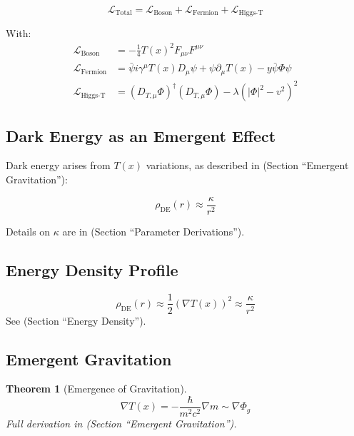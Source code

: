 \documentclass[a4paper,12pt]{article}
\newtheorem{theorem}{Theorem}[section]
\theoremstyle{definition}
\theoremstyle{remark}
\newcommand{\Tfield}{T(x)}
\newcommand{\DcovT}[1]{\Tfield D_\mu #1 + #1 \partial_\mu \Tfield}
\begin{document}
	\begin{equation}
		\mathcal{L}_{\text{Total}} = \mathcal{L}_{\text{Boson}} + \mathcal{L}_{\text{Fermion}} + \mathcal{L}_{\text{Higgs-T}}
	\end{equation}
	
	With:
	\begin{align}
		\mathcal{L}_{\text{Boson}} &= -\frac{1}{4} \Tfield^2 F_{\mu\nu} F^{\mu\nu} \\
		\mathcal{L}_{\text{Fermion}} &= \bar{\psi} i \gamma^\mu \DcovT{\psi} - y \bar{\psi} \Phi \psi \\
		\mathcal{L}_{\text{Higgs-T}} &= (D_{T,\mu} \Phi)^\dagger (D_{T,\mu} \Phi) - \lambda (|\Phi|^2 - v^2)^2
	\end{align}
	
	\subsection{Dark Energy as an Emergent Effect}
	
	Dark energy arises from \(\Tfield\) variations, as described in \cite{pascher_galaxies_2025} (Section “Emergent Gravitation”):
	
	\begin{equation}
		\rho_{\text{DE}}(r) \approx \frac{\kappa}{r^2}
	\end{equation}
	
	Details on \(\kappa\) are in \cite{pascher_params_2025} (Section “Parameter Derivations”).
	
	\subsection{Energy Density Profile}
	
	\begin{equation}
		\rho_{\text{DE}}(r) \approx \frac{1}{2} (\nabla \Tfield)^2 \approx \frac{\kappa}{r^2}
	\end{equation}
	See \cite{pascher_galaxies_2025} (Section “Energy Density”).
	
	\subsection{Emergent Gravitation}
	
	\begin{theorem}[Emergence of Gravitation]
		\begin{equation}
			\nabla \Tfield = -\frac{\hbar}{m^2 c^2} \nabla m \sim \nabla \Phi_g
		\end{equation}
		Full derivation in \cite{pascher_galaxies_2025} (Section “Emergent Gravitation”).
	\end{theorem}
	
\end{document}
